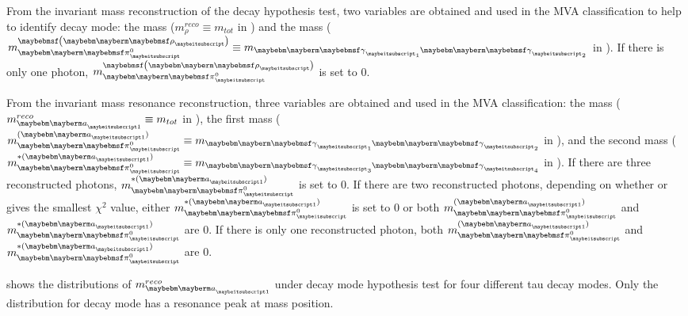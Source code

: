 



From  the \Prho invariant mass reconstruction of the \decayRhoShort  decay hypothesis test,  two variables are  obtained and  used in the MVA classification to help to identify  \decayRhoShort  decay mode: the \Prho mass ($m^{reco}_\rho \equiv m_{tot}$ in ) and the \Ppizero mass ($m_{\Pgpz}^{\parenths{\Prho}} \equiv m_{\Pphoton_1\Pphoton_2}$ in  ). If there is only one photon, $m_{\Pgpz}^{\parenths{\Prho}}$ is set to 0.

From the \Pai invariant mass resonance reconstruction, three variables are obtained and used in the MVA classification:  the \Pai mass ($m^{reco}_{\Pai} \equiv m_{tot}$ in ), the first \Ppizero mass ($m_{\Pgpz}^{(\Pai)} \equiv m_{\Pphoton_1\Pphoton_2}$ in ), and the second \Ppizero mass ($m^{*(\Pai)}_{\Pgpz} \equiv  m_{\Pphoton_3\Pphoton_4}$ in ). If there are three reconstructed photons, $m^{*(\Pai)}_{\Pgpz}$ is set to   0. If there are two reconstructed photons, depending on whether  or  gives the smallest $\chi^2$ value, either $m^{*(\Pai)}_{\Pgpz}$ is set to   0 or both $m_{\Pgpz}^{(\Pai)}$ and $m^{*(\Pai)}_{\Pgpz}$ are 0. If there is only one reconstructed photon, both $m_{\Pgpz}^{(\Pai)}$ and $m^{*(\Pai)}_{\Pgpz}$ are 0.

  shows the distributions of  $m^{reco}_{\Pai}$ under \decayAiPhotonShort decay mode hypothesis test for four different tau decay modes. Only the distribution for \decayAiPhotonShort decay mode has a resonance peak at \Pai mass position.


